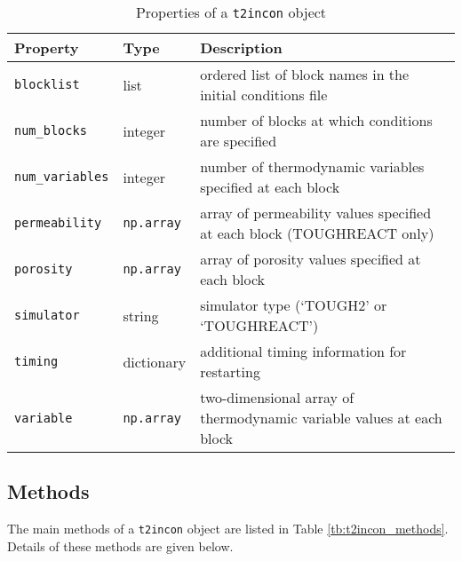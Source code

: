\begin{table}
  \begin{center}
    \begin{tabular}{|l|l|p{75mm}|}
      \hline
      \textbf{Property} & \textbf{Type} & \textbf{Description}\\
      \hline
      \texttt{blocklist} & list & ordered list of block names in the initial conditions file\\
      \texttt{num\_blocks} & integer & number of blocks at which conditions are specified \\
      \texttt{num\_variables} & integer & number of thermodynamic variables specified at each block\\
      \texttt{permeability} & \texttt{np.array} & array of permeability values specified at each block (TOUGHREACT only)\\
      \texttt{porosity} & \texttt{np.array} & array of porosity values specified at each block\\
      \texttt{simulator} & string & simulator type (`TOUGH2' or `TOUGHREACT')\\
      \texttt{timing} & dictionary & additional timing information for restarting\\
      \texttt{variable} & \texttt{np.array} & two-dimensional array of thermodynamic variable values at each block\\
      \hline
    \end{tabular}
    \caption{Properties of a \texttt{t2incon} object}
    \label{tb:t2incon_properties}
  \end{center}
\end{table}

\subsection{Methods}

The main methods of a \texttt{t2incon} object are listed in Table \ref{tb:t2incon_methods}.  Details of these methods are given below.

